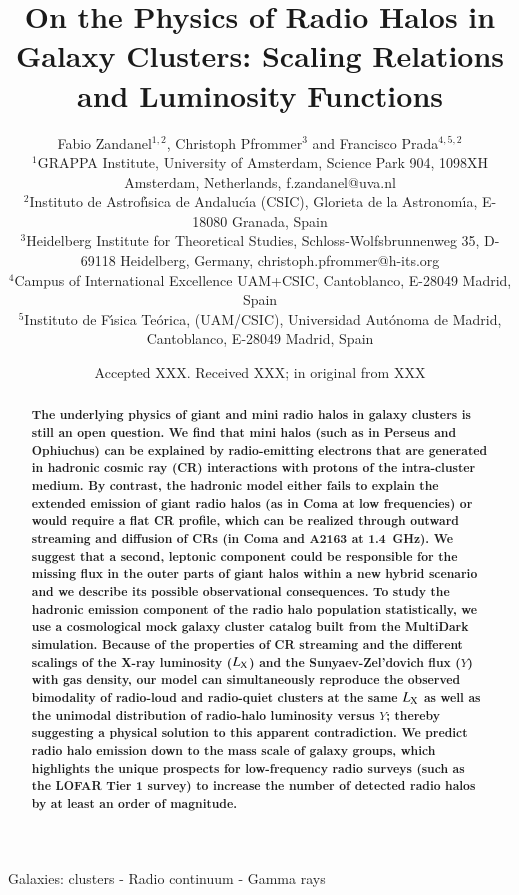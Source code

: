\documentclass[useAMS,usenatbib]{mn2e}
\title[On the Physics of Radio Halos in Galaxy Clusters]{On the Physics of Radio Halos in Galaxy Clusters: Scaling Relations and Luminosity Functions}
\author[F. Zandanel, C. Pfrommer and F. Prada]{
Fabio Zandanel$^{1,2}$, Christoph Pfrommer$^{3}$ and Francisco Prada$^{4,5,2}$\\
$^{1}$GRAPPA Institute, University of Amsterdam, Science Park 904, 1098XH Amsterdam, Netherlands, f.zandanel@uva.nl\\
$^{2}$Instituto de Astrof\'{\i}sica de Andaluc\'{\i}a (CSIC), Glorieta de la Astronom\'{\i}a, E-18080 Granada, Spain\\
$^{3}$Heidelberg Institute for Theoretical Studies, Schloss-Wolfsbrunnenweg 35, D-69118 Heidelberg, Germany, christoph.pfrommer@h-its.org\\
$^{4}$Campus of International Excellence UAM+CSIC, Cantoblanco, E-28049 Madrid, Spain\\
$^{5}$Instituto de F\'{\i}sica Te\'orica, (UAM/CSIC), Universidad Aut\'onoma de Madrid, Cantoblanco, E-28049 Madrid, Spain}
\begin{document}
\date{Accepted XXX. Received XXX; in original from XXX}

\pagerange{\pageref{firstpage}--\pageref{lastpage}} 

\maketitle

\label{firstpage}

\begin{abstract}
  {\bf The underlying physics of giant and mini radio halos in galaxy clusters
    is still an open question. We find that mini halos (such as in Perseus and
    Ophiuchus) can be explained by radio-emitting electrons that are generated
    in hadronic cosmic ray (CR) interactions with protons of the intra-cluster
    medium. By contrast, the hadronic model either fails to explain the extended
    emission of giant radio halos (as in Coma at low frequencies) or would
    require a flat CR profile, which can be realized through outward streaming
    and diffusion of CRs (in Coma and A2163 at 1.4~GHz).  We suggest that a
    second, leptonic component could be responsible for the missing flux in the
    outer parts of giant halos within a new hybrid scenario and we describe its
    possible observational consequences.  To study the hadronic emission
    component of the radio halo population statistically, we use a cosmological
    mock galaxy cluster catalog built from the MultiDark simulation. Because of
    the properties of CR streaming and the different scalings of the X-ray
    luminosity ($L_{{\mathrm{X}}}$) and the Sunyaev-Zel'dovich flux ($Y$) with gas
    density, our model can simultaneously reproduce the observed bimodality of
    radio-loud and radio-quiet clusters at the same $L_{{\mathrm{X}}}$ as well as the
    unimodal distribution of radio-halo luminosity versus $Y$; thereby
    suggesting a physical solution to this apparent contradiction. We predict
    radio halo emission down to the mass scale of galaxy groups, which
    highlights the unique prospects for low-frequency radio surveys (such as the
    LOFAR Tier 1 survey) to increase the number of detected radio halos by at
    least an order of magnitude.}
\end{abstract}

\begin{keywords}
  Galaxies: clusters - Radio continuum - Gamma rays
\end{keywords}
\end{document}
